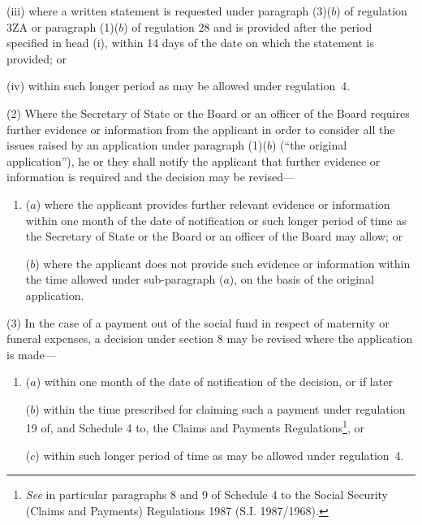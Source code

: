 \documentclass[12pt,a4paper]{article}
\begin{document}
\begin{enumerate}
\begin{enumerate}
(iii) where a written statement is requested under 
paragraph (3)($b$)  of regulation 3ZA or  %
paragraph (1)($b$)  of regulation 28 and is provided after the period specified in head (i), within 14 days of the date on which the statement is provided; or

(iv) within such longer period as may be allowed under regulation~4.
\end{enumerate}
\end{enumerate}

(2) Where the Secretary of State 
or the Board or an officer of the Board  %
requires further evidence or information from the applicant in order to consider all the issues raised by an application under paragraph (1)($b$) (“the original application”), he 
or they  %
shall notify the applicant that further evidence or information is required and the decision may be revised—
\begin{enumerate}\item[]
($a$) where the applicant provides further relevant evidence or information within one month of the date of notification or such longer period of time as the Secretary of State 
or the Board or an officer of the Board  %
may allow; or

($b$) where the applicant does not provide such evidence or information within the time allowed under sub-paragraph ($a$), on the basis of the original application.
\end{enumerate}

(3) In the case of a payment out of the social fund in respect of maternity or funeral expenses, a decision under section 8 may be revised where the application is made—
\begin{enumerate}\item[]
($a$) within one month of the date of notification of the decision, or if later

($b$) within the time prescribed for claiming such a payment under regulation 19 of, and Schedule 4 to, the Claims and Payments Regulations\footnote{\frenchspacing \emph{See} in particular paragraphs 8 and 9 of Schedule 4 to the Social Security (Claims and Payments) Regulations 1987 (S.I. 1987/1968).}, or

($c$) within such longer period of time as may be allowed under regulation~4.
\end{enumerate}
\end{document}
